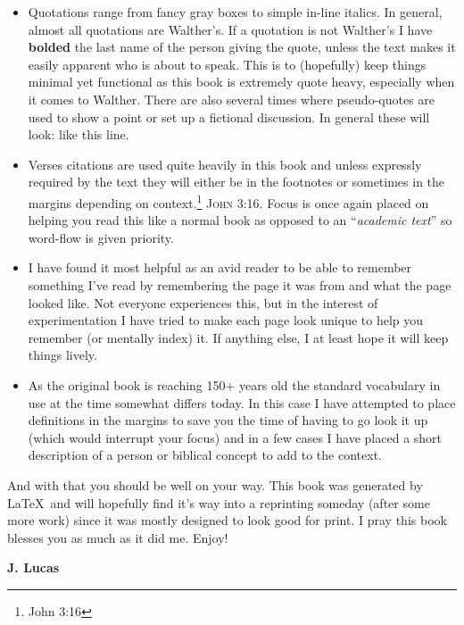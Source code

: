\documentclass[
     12pt,                     %
     a4paper,                  %
     BCOR=5mm,                %
     DIV=12,                   %
     openright,
     twoside,
     headsepline
]{book}
\def\blankpage{%
      \clearpage%
      \thispagestyle{empty}%
      \addtocounter{page}{-1}%
      \null%
      \clearpage}
\begin{document}
\begin{itemize}
\item Quotations range from fancy gray boxes to simple in-line italics.  In general,  almost all quotations are Walther's.  If a quotation is not Walther's I have \textbf{bolded} the last name of the person giving the quote,  unless the text makes it easily apparent who is about to speak.  This is to {\footnotesize (hopefully)}  keep things minimal yet functional as this book is extremely quote heavy,  especially when it comes to Walther.  There are also several times where pseudo-quotes are used to show a point or set up a fictional discussion.  In general these will look: {\footnotesize like this line.}
\item Verses citations are used quite heavily in this book and unless expressly required by the text they will either be in the footnotes or sometimes in the margins depending on context.\footnote{John 3:16}   {\scriptsize\textsc{John 3:16}}.  Focus is once again placed on helping you read this like a normal book as opposed to an ``\textit{academic text}''  so word-flow is given priority.
\item I have found it most helpful as an avid reader to be able to remember something I've read by remembering the page it was from and what the page looked like.  Not everyone experiences this,  but in the interest of experimentation I have tried to make each page look unique to help you remember {\footnotesize (or mentally index)} it.  If anything else,  I at least hope it will keep things lively.
\item As the original book is reaching 150+ years old the standard vocabulary in use at the time somewhat differs today.  In this case I have attempted to place definitions in the margins to save you the time of having to go look it up {\footnotesize (which would interrupt your focus)} and in a few cases I have placed a short description of a person or biblical concept to add to the context.
\end{itemize}

And with that you should be well on your way.  This book was generated by \LaTeX\  and will hopefully find it's way into a reprinting someday {\footnotesize (after some more work)} since it was mostly designed to look good for print.\divider
I pray this book blesses you as much as it did me.  Enjoy! \par\hfill \textbf{J.  Lucas}
\mainmatter























\blankpage
\end{document}
